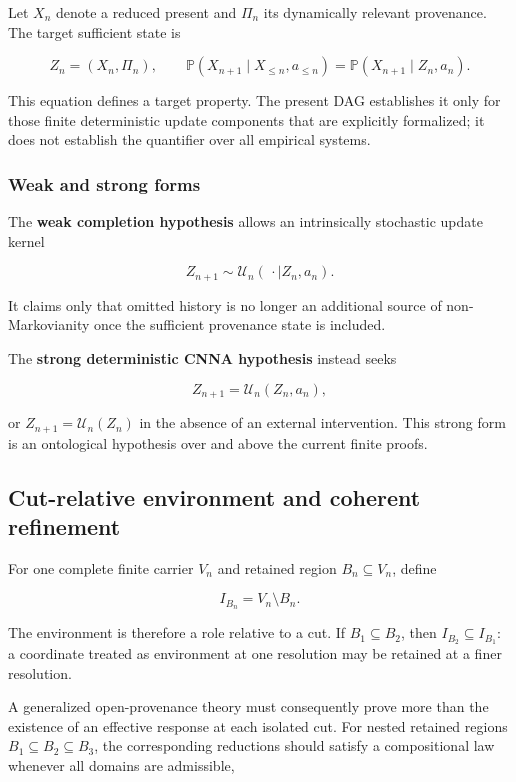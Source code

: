 Let \(X_n\) denote a reduced present and \(\Pi_n\) its dynamically
relevant provenance. The target sufficient state is

\[
Z_n=(X_n,\Pi_n),
\qquad
\mathbb P(X_{n+1}\mid X_{\le n},a_{\le n})
=
\mathbb P(X_{n+1}\mid Z_n,a_n).
\]

This equation defines a target property. The present DAG establishes it
only for those finite deterministic update components that are
explicitly formalized; it does not establish the quantifier over all
empirical systems.

\subsubsection{Weak and strong forms}\label{weak-and-strong-forms}

The \textbf{weak completion hypothesis} allows an intrinsically
stochastic update kernel

\[
Z_{n+1}\sim\mathcal U_n(\,\cdot\mid Z_n,a_n).
\]

It claims only that omitted history is no longer an additional source of
non-Markovianity once the sufficient provenance state is included.

The \textbf{strong deterministic CNNA hypothesis} instead seeks

\[
Z_{n+1}=\mathcal U_n(Z_n,a_n),
\]

or \(Z_{n+1}=\mathcal U_n(Z_n)\) in the absence of an external
intervention. This strong form is an ontological hypothesis over and
above the current finite proofs.

\subsection{Cut-relative environment and coherent
refinement}\label{cut-relative-environment-and-coherent-refinement}

For one complete finite carrier \(V_n\) and retained region
\(B_n\subseteq V_n\), define

\[
I_{B_n}=V_n\setminus B_n.
\]

The environment is therefore a role relative to a cut. If
\(B_1\subseteq B_2\), then \(I_{B_2}\subseteq I_{B_1}\): a coordinate
treated as environment at one resolution may be retained at a finer
resolution.

A generalized open-provenance theory must consequently prove more than
the existence of an effective response at each isolated cut. For nested
retained regions \(B_1\subseteq B_2\subseteq B_3\), the corresponding
reductions should satisfy a compositional law whenever all domains are
admissible,


